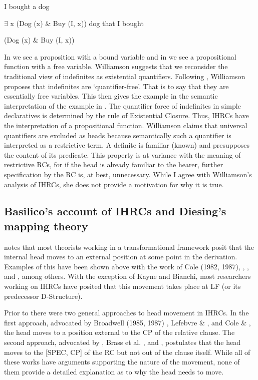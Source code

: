 \documentclass[output=paper]{LSP/langsci}
\begin{document}
\ea I bought a dog	\label{boyle40}

$\exists$ x (Dog (x) \& Buy (I, x))
\ex dog that I bought \label{boyle41}

(Dog (x) \& Buy (I, x))
\z	
	
In  we see a proposition with a bound variable and in  we see a propositional function with a free variable. Williamson suggests that we reconsider the traditional view of indefinites as existential quantifiers. Following \citet{Heim1982}, Williamson proposes that indefinites are `quantifier-free'. That is to say that they are essentially free variables. This then gives the example in  the semantic interpretation of the example in . The quantifier force of indefinites in simple declaratives is determined by the rule of Existential Closure. Thus, IHRCs have the interpretation of a propositional function. Williamson claims that universal quantifiers are excluded as heads because semantically such a quantifier is interpreted as a restrictive term. A definite is familiar (known) and presupposes the content of its predicate.  This property is at variance with the meaning of restrictive RCs, for if the head is already familiar to the hearer, further specification by the RC is, at best, unnecessary.  While I agree with Williamson's analysis of IHRCs, she does not provide a motivation for why it is true.

\subsection{Basilico's account of IHRCs and Diesing's mapping theory}

\citet{Basilico1996} notes that most theorists working in a transformational framework posit that the internal head moves to an external position at some point in the derivation. Examples of this have been shown above with the work of Cole (1982, 1987), \citet{Williamson1987}, \citet{Culy1990}, \citet{Kayne1994} and \citet{Bianchi1999}, among others. With the exception of Kayne and Bianchi, most researchers working on IHRCs have posited that this movement takes place at LF (or its predecessor D-Structure). 

Prior to \citet{Basilico1996} there were two general approaches to head movement in IHRCs. In the first approach, advocated by Broadwell (1985, 1987) \citet{Cole1987}, Lefebvre \& \citet{Muysken1988}, and Cole \& \citet{Hermon1994}, the head moves to a position external to the CP of the relative clause. The second approach, advocated by \citet{Williamson1987}, Brass et al. , and \citet{Bonneau1992}, postulates that the head moves to the [SPEC, CP] of the RC but not out of the clause itself. While all of these works have arguments supporting the nature of the movement, none of them provide a detailed explanation as to why the head needs to move.  
\end{document}
